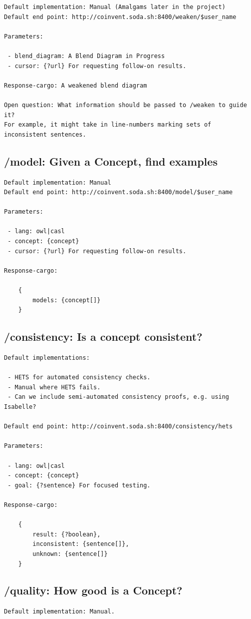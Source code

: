 \documentclass[10pt]{article}
\begin{document}
\begin{appendices}
\begin{verbatim}
Default implementation: Manual (Amalgams later in the project)         
Default end point: http://coinvent.soda.sh:8400/weaken/$user_name

Parameters: 

 - blend_diagram: A Blend Diagram in Progress
 - cursor: {?url} For requesting follow-on results.
 
Response-cargo: A weakened blend diagram

Open question: What information should be passed to /weaken to guide it? 
For example, it might take in line-numbers marking sets of inconsistent sentences.
\end{verbatim}
\subsection{/model: Given a Concept, find examples}
\begin{verbatim}
Default implementation: Manual   
Default end point: http://coinvent.soda.sh:8400/model/$user_name

Parameters:

 - lang: owl|casl
 - concept: {concept} 
 - cursor: {?url} For requesting follow-on results.
   
Response-cargo: 
	
	{
		models: {concept[]} 
	}
\end{verbatim}
\subsection{/consistency: Is a concept consistent?}
\begin{verbatim}
Default implementations: 

 - HETS for automated consistency checks.
 - Manual where HETS fails.
 - Can we include semi-automated consistency proofs, e.g. using Isabelle?
 
Default end point: http://coinvent.soda.sh:8400/consistency/hets

Parameters:

 - lang: owl|casl
 - concept: {concept} 
 - goal: {?sentence} For focused testing.

Response-cargo: 
	
	{
		result: {?boolean},
		inconsistent: {sentence[]},
		unknown: {sentence[]}
	}

\end{verbatim}
\subsection{/quality: How good is a Concept?}
\begin{verbatim}
Default implementation: Manual.


\end{verbatim}
\end{appendices}
\end{document}
